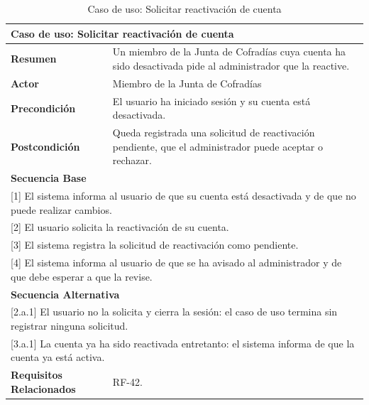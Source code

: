 \begin{table}[h!]
    \begin{tabular}{|p{4cm}|p{11cm}|}
        \hline
        \multicolumn{2}{|l|}{\textbf{Caso de uso: Solicitar reactivación de cuenta}} \\
        \hline
        \textbf{Resumen} & Un miembro de la Junta de Cofradías cuya cuenta ha sido desactivada pide al administrador que la reactive. \\
        \hline
        \textbf{Actor} & Miembro de la Junta de Cofradías \\
        \hline
        \textbf{Precondición} & El usuario ha iniciado sesión y su cuenta está desactivada. \\
        \hline
        \textbf{Postcondición} & Queda registrada una solicitud de reactivación pendiente, que el administrador puede aceptar o rechazar. \\
        \hline
        \multicolumn{2}{|l|}{\textbf{Secuencia Base}} \\
        \hline
        \multicolumn{2}{|p{15cm}|}{ [1] El sistema informa al usuario de que su cuenta está desactivada y de que no puede realizar cambios. } \\
        \hline
        \multicolumn{2}{|p{15cm}|}{ [2] El usuario solicita la reactivación de su cuenta. } \\
        \hline
        \multicolumn{2}{|p{15cm}|}{ [3] El sistema registra la solicitud de reactivación como pendiente. } \\
        \hline
        \multicolumn{2}{|p{15cm}|}{ [4] El sistema informa al usuario de que se ha avisado al administrador y de que debe esperar a que la revise. } \\
        \hline
        \multicolumn{2}{|l|}{\textbf{Secuencia Alternativa}} \\
        \hline
        \multicolumn{2}{|p{15cm}|}{ [2.a.1] El usuario no la solicita y cierra la sesión: el caso de uso termina sin registrar ninguna solicitud. } \\
        \hline
        \multicolumn{2}{|p{15cm}|}{ [3.a.1] La cuenta ya ha sido reactivada entretanto: el sistema informa de que la cuenta ya está activa. } \\
        \hline
        \textbf{Requisitos Relacionados} & RF-42. \\
        \hline
    \end{tabular}
    \caption{Caso de uso: Solicitar reactivación de cuenta}
\end{table}

